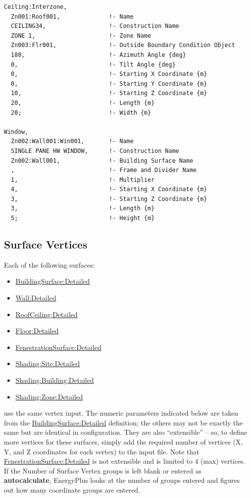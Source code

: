 \begin{lstlisting}
Ceiling:Interzone,
  Zn001:Roof001,              !- Name
  CEILING34,                  !- Construction Name
  ZONE 1,                     !- Zone Name
  Zn003:Flr001,               !- Outside Boundary Condition Object
  180,                        !- Azimuth Angle {deg}
  0,                          !- Tilt Angle {deg}
  0,                          !- Starting X Coordinate {m}
  0,                          !- Starting Y Coordinate {m}
  10,                         !- Starting Z Coordinate {m}
  20,                         !- Length {m}
  20;                         !- Width {m}

Window,
  Zn002:Wall001:Win001,       !- Name
  SINGLE PANE HW WINDOW,      !- Construction Name
  Zn002:Wall001,              !- Building Surface Name
  ,                           !- Frame and Divider Name
  1,                          !- Multiplier
  4,                          !- Starting X Coordinate {m}
  3,                          !- Starting Z Coordinate {m}
  3,                          !- Length {m}
  5;                          !- Height {m}
\end{lstlisting}

\subsection{Surface Vertices}\label{surface-vertices}

Each of the following surfaces:

\begin{itemize}
\item
  \hyperref[buildingsurfacedetailed]{BuildingSurface:Detailed}
\item
  \hyperref[walldetailed]{Wall:Detailed}
\item
  \hyperref[roofceilingdetailed]{RoofCeiling:Detailed}
\item
  \hyperref[floordetailed]{Floor:Detailed}
\item
  \hyperref[fenestrationsurfacedetailed]{FenestrationSurface:Detailed}
\item
  \hyperref[shadingsitedetailed-shadingbuildingdetailed]{Shading:Site:Detailed}
\item
  \hyperref[shadingsitedetailed-shadingbuildingdetailed]{Shading:Building:Detailed}
\item
  \hyperref[shadingzonedetailed-000]{Shading:Zone:Detailed}
\end{itemize}

use the same vertex input. The numeric parameters indicated below are taken from the \hyperref[buildingsurfacedetailed]{BuildingSurface:Detailed} definition; the others may not be exactly the same but are identical in configuration. They are also ``extensible'' -- so, to define more vertices for these surfaces, simply add the required number of vertices (X, Y, and Z coordinates for each vertex) to the input file. Note that \hyperref[fenestrationsurfacedetailed]{FenestrationSurface:Detailed} is not extensible and is limited to 4 (max) vertices. If the Number of Surface Vertex groups is left blank or entered as \textbf{autocalculate}, EnergyPlus looks at the number of groups entered and figures out how many coordinate groups are entered.

